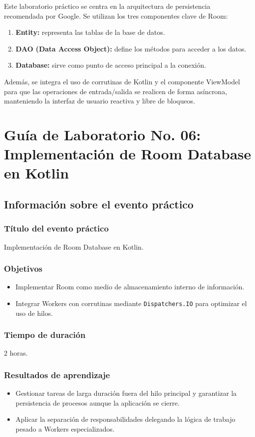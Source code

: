 \documentclass[12pt,a4paper,oneside]{report}
\begin{document}
Este laboratorio práctico se centra en la arquitectura de persistencia recomendada
por Google. Se utilizan los tres componentes clave de Room:
\begin{enumerate}[label=\arabic*.]
  \item \textbf{Entity:} representa las tablas de la base de datos.
  \item \textbf{DAO (Data Access Object):} define los métodos para acceder a los datos.
  \item \textbf{Database:} sirve como punto de acceso principal a la conexión.
\end{enumerate}

Además, se integra el uso de corrutinas de Kotlin y el componente ViewModel para
que las operaciones de entrada/salida se realicen de forma asíncrona, manteniendo
la interfaz de usuario reactiva y libre de bloqueos.

\chapter{Guía de Laboratorio No. 06: Implementación de Room Database en Kotlin}

\section{Información sobre el evento práctico}

\subsection{Título del evento práctico}
Implementación de Room Database en Kotlin.

\subsection{Objetivos}
\begin{itemize}
  \item Implementar Room como medio de almacenamiento interno de información.
  \item Integrar Workers con corrutinas mediante \texttt{Dispatchers.IO} para optimizar el uso de hilos.
\end{itemize}

\subsection{Tiempo de duración}
2 horas.

\subsection{Resultados de aprendizaje}
\begin{itemize}
  \item Gestionar tareas de larga duración fuera del hilo principal y garantizar la persistencia de procesos aunque la aplicación se cierre.
  \item Aplicar la separación de responsabilidades delegando la lógica de trabajo pesado a Workers especializados.
\end{itemize}
\end{document}
